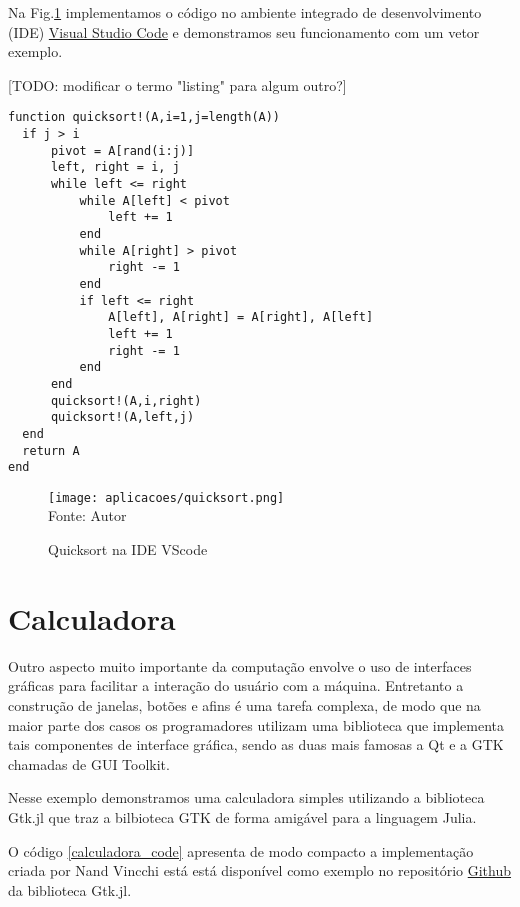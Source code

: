 Na Fig.\ref{quicksort} implementamos o código no ambiente integrado de desenvolvimento (IDE) \href{https://code.visualstudio.com/docs}{Visual Studio Code} e demonstramos seu funcionamento com um vetor exemplo. 

[TODO: modificar o termo "listing" para algum outro?] 
\begin{lstlisting}[label={quicksort_code},caption={Implementação do algoritmo quicksort em Julia}]
  function quicksort!(A,i=1,j=length(A))
  if j > i
      pivot = A[rand(i:j)] 
      left, right = i, j
      while left <= right
          while A[left] < pivot
              left += 1
          end
          while A[right] > pivot
              right -= 1
          end
          if left <= right
              A[left], A[right] = A[right], A[left]
              left += 1
              right -= 1
          end
      end
      quicksort!(A,i,right)
      quicksort!(A,left,j)
  end
  return A
end
\end{lstlisting}

\begin{figure}[H]
   \begin{center}
       \caption{Quicksort na IDE VScode} \label{quicksort}
       \texttt{[image: aplicacoes/quicksort.png]} \\
       {\tiny \sf Fonte: Autor}
   \end{center}
\end{figure}

\section{Calculadora}
Outro aspecto muito importante da computação envolve o uso de interfaces gráficas para facilitar a interação do usuário com a máquina.
Entretanto a construção de janelas, botões e afins é uma tarefa complexa, de modo que na maior parte dos casos os programadores utilizam uma biblioteca que implementa tais componentes de interface gráfica, sendo as duas mais famosas a Qt e a GTK chamadas de GUI Toolkit. %

Nesse exemplo demonstramos uma calculadora simples utilizando a biblioteca Gtk.jl que traz a bilbioteca GTK de forma amigável para a linguagem Julia. 

O código \ref{calculadora_code} apresenta de modo compacto a implementação criada por Nand Vincchi está está disponível como exemplo no repositório \href{https://github.com/JuliaGraphics/Gtk.jl/blob/master/example/calculator.jl}{Github} da biblioteca Gtk.jl. 

